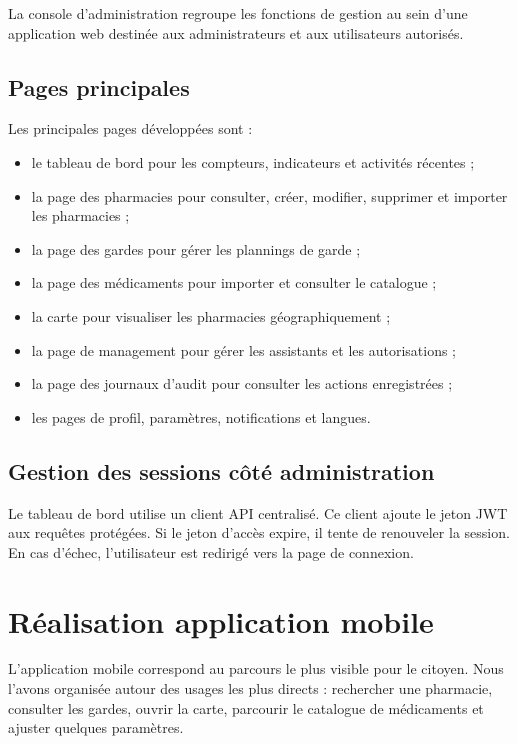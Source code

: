 La console d'administration regroupe les fonctions de gestion au sein d'une application web destinée aux
administrateurs et aux utilisateurs autorisés.

\subsection{Pages principales}

Les principales pages développées sont :

\begin{itemize}
    \item le tableau de bord pour les compteurs, indicateurs et activités récentes ;
    \item la page des pharmacies pour consulter, créer, modifier, supprimer et importer les pharmacies ;
    \item la page des gardes pour gérer les plannings de garde ;
    \item la page des médicaments pour importer et consulter le catalogue ;
    \item la carte pour visualiser les pharmacies géographiquement ;
    \item la page de management pour gérer les assistants et les autorisations ;
    \item la page des journaux d'audit pour consulter les actions enregistrées ;
    \item les pages de profil, paramètres, notifications et langues.
\end{itemize}

\subsection{Gestion des sessions côté administration}

Le tableau de bord utilise un client API centralisé. Ce client ajoute le jeton JWT aux requêtes protégées.
Si le jeton d'accès expire, il tente de renouveler la session. En cas d'échec, l'utilisateur est redirigé
vers la page de connexion.

\section{Réalisation application mobile}

L'application mobile correspond au parcours le plus visible pour le citoyen. Nous l'avons organisée autour
des usages les plus directs : rechercher une pharmacie, consulter les gardes, ouvrir la carte, parcourir le
catalogue de médicaments et ajuster quelques paramètres.

